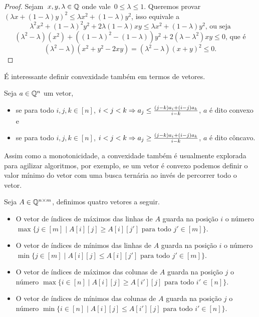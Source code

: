 \begin{proof}
Sejam~$x,y,\lambda \in \mathbb{Q}$ onde vale~$0 \leq \lambda \leq 1$. Queremos provar~$(\lambda x + (1 - \lambda)y)^2 \leq \lambda x^2 + (1 - \lambda) y^2$, isso equivale a
$$\lambda^2x^2 + (1 - \lambda)^2y^2 + 2\lambda(1-\lambda)xy \leq \lambda x^2 + (1 - \lambda)y^2 \text{, ou seja}$$
$$(\lambda^2 - \lambda)(x^2) + ((1-\lambda)^2 - (1 - \lambda))y^2 + 2(\lambda - \lambda^2)xy \leq 0 \text{, que é}$$
$$(\lambda^2 - \lambda)(x^2 + y^2 - 2xy) = (\lambda^2 - \lambda)(x + y)^2 \leq 0 \text{.}$$
\end{proof}

É interessante definir convexidade também em termos de vetores.

\begin{defi}
Seja $a \in \mathbb{Q}^n$ um vetor,
    \begin{itemize}
        \item se para todo $i,j,k \in [n]$, $i < j < k \Rightarrow a_j \leq \frac{(j-k)a_i + (i-j)a_k}{i-k}$, $a$ é dito convexo e
        \item se para todo $i,j,k \in [n]$, $i < j < k \Rightarrow a_j \geq \frac{(j-k)a_i + (i-j)a_k}{i-k}$, $a$ é dito côncavo.
    \end{itemize}
\end{defi}

Assim como a monotonicidade, a convexidade também é usualmente explorada para agilizar algoritmos, por exemplo, se um vetor é convexo podemos definir o valor mínimo do vetor com uma busca ternária ao invés de percorrer todo o vetor.  

\begin{defi}
Seja $A \in \mathbb{Q}^{n \times m}$, definimos quatro vetores a seguir.
    \begin{itemize}
        \item O vetor de índices de máximos das linhas de $A$ guarda na posição $i$ 
              o número $\max\{j \in [m] \mid A[i][j] \geq A[i][j'] \text{ para todo } j' \in [m]\}$. 
        \item O vetor de índices de mínimos das linhas de $A$ guarda na posição $i$ 
              o número $\min\{j \in [m] \mid A[i][j] \leq A[i][j'] \text{ para todo } j' \in [m]\}$. 
        \item O vetor de índices de máximos das colunas de $A$ guarda na posição $j$ 
              o número $\max\{i \in [n] \mid A[i][j] \geq A[i'][j] \text{ para todo } i' \in [n]\}$. 
        \item O vetor de índices de mínimos das colunas de $A$ guarda na posição $j$ 
              o número $\min\{i \in [n] \mid A[i][j] \leq A[i'][j] \text{ para todo } i' \in [n]\}$. 
    \end{itemize}
\end{defi}

